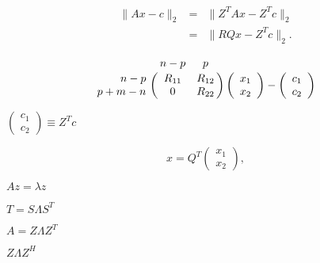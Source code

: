 {\newpage\clearpage
{}%
\begin{eqnarray*}
\|A x - c \|_2 & = & \| Z^T A x - Z^T c \|_2 \\
               & = & \| R Q x - Z^T c \|_2.
\end{eqnarray*}%
\lthtmldisplayZ
\lthtmlcheckvsize\clearpage}

{\newpage\clearpage
{}%
\begin{displaymath}
\bordermatrix{        &  n-p   & p   \cr
      \hfill   n-p    & R_{11} & R_{12}   \cr
               p+m-n  &   0    & R_{22}   }
\left( \begin{array}{c} x_1 \\x_2 \end{array} \right) - \left( \begin{array}{c} c_1 \\c_2 \end{array} \right) 
\end{displaymath}%
\lthtmldisplayZ
\lthtmlcheckvsize\clearpage}

{\newpage\clearpage
{}%
$\left( \begin{array}{c} c_1 \\c_2 \end{array} \right) \equiv Z^T c$%
\lthtmlinlinemathZ
\lthtmlcheckvsize\clearpage}

{\newpage\clearpage
{}%
\begin{displaymath}
x = Q^T \left( \begin{array}{c} x_1 \\x_2 \end{array} \right) ,
\end{displaymath}%
\lthtmldisplayZ
\lthtmlcheckvsize\clearpage}

{\newpage\clearpage
{}%
$Az = \lambda z$%
\lthtmlinlinemathZ
\lthtmlcheckvsize\clearpage}

{\newpage\clearpage
{}%
$T = S \Lambda S^T$%
\lthtmlinlinemathZ
\lthtmlcheckvsize\clearpage}

{\newpage\clearpage
{}%
$A=Z \Lambda Z^T$%
\lthtmlinlinemathZ
\lthtmlcheckvsize\clearpage}

{\newpage\clearpage
{}%
$Z \Lambda Z^H$%
\lthtmlinlinemathZ
\lthtmlcheckvsize\clearpage}

